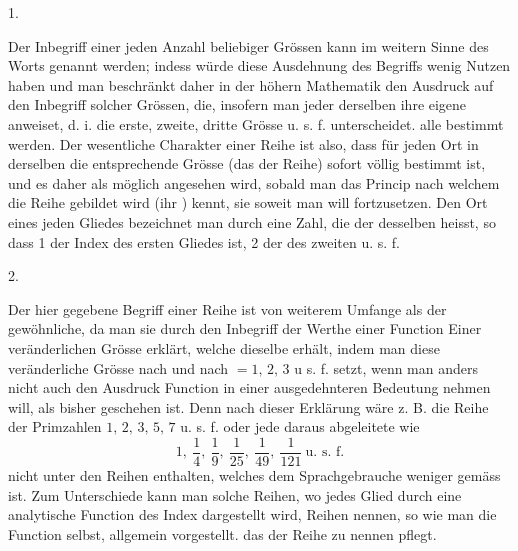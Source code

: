 \clearpage\NoSourceHead{}
\begin{center}1.\end{center}
\noindent\hspace*{\parindent}Der Inbegriff einer jeden Anzahl beliebiger Grössen kann im weitern Sinne des Worts  genannt werden; indess würde diese Ausdehnung des Begriffs wenig Nutzen haben und man beschränkt daher in der höhern Mathematik den Ausdruck  auf den Inbegriff solcher Grössen, die, insofern man jeder derselben ihre eigene  anweiset, d. i. die erste, zweite, dritte Grösse u. s. f. unterscheidet. alle  bestimmt werden. Der wesentliche Charakter einer Reihe ist also, dass für jeden Ort in derselben die entsprechende Grösse (das  der Reihe) sofort völlig bestimmt ist, und es daher als möglich angesehen wird, sobald man das Princip nach welchem die Reihe gebildet wird (ihr ) kennt, sie soweit man will fortzusetzen. Den Ort eines jeden Gliedes bezeichnet man durch eine Zahl, die der  desselben heisst, so dass 1 der Index des ersten Gliedes ist, 2 der des zweiten u. s. f.
\begin{center}2.\end{center}
\noindent\hspace*{\parindent}Der hier gegebene Begriff einer Reihe ist von weiterem Umfange als der gewöhnliche, da man sie durch den Inbegriff der Werthe einer Function Einer veränderlichen Grösse erklärt, welche dieselbe erhält, indem man diese veränderliche Grösse nach und nach \(=1,\,2,\,3\) u s. f. setzt, wenn man anders nicht auch den Ausdruck Function in einer ausgedehnteren Bedeutung nehmen
\clearpage{}
\noindent will, als bisher geschehen ist. Denn nach dieser Erklärung wäre z. B. die Reihe der Primzahlen \(1,\,2,\,3,\,5,\,7\) u. s. f. oder jede daraus abgeleitete wie
\[
1,\ \frac14,\ \frac19,\ \frac1{25},\ \frac1{49},\ \frac1{121}\ \text{u. s. f.}
\]
\noindent nicht unter den Reihen enthalten, welches dem Sprachgebrauche weniger gemäss ist. Zum Unterschiede kann man solche Reihen, wo jedes Glied durch eine analytische Function des Index dargestellt wird,  Reihen nennen, so wie man die Function selbst, allgemein vorgestellt. das  der Reihe zu nennen pflegt.

